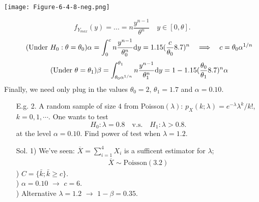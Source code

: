\begin{frame}
	\begin{center}
 \texttt{[image: Figure-6-4-8-neg.png]}
	\end{center}
\[
	f_{Y_{max}}(y) = ... = n\frac{y^{n-1}}{\theta^n} \quad y\in[0,\theta].
\]
\begin{align}\tag{Under $H_0:\theta=\theta_0$}
	\alpha = \int_0^c n\frac{y^{n-1}}{\theta_0^n}\mathrm{d} y = 1.15( \frac{c}{\theta_0} 8.7)^n \quad \Longrightarrow\quad  c= \theta_0\alpha^{1/n}
\end{align}
\begin{align}\tag{Under $\theta=\theta_1$}
\beta = \int_{\theta_0\alpha^{1/n}}^{\theta_1} n\frac{y^{n-1}}{\theta_1^n}\mathrm{d} y
 = 1- 1.15(\frac{\theta_0}{\theta_1}8.7)^n \alpha
\end{align}
Finally, we need only plug in the values $\theta_0=2$, $\theta_1=1.7$ and $\alpha=0.10$.
\myEnd
\end{frame}
\begin{frame}
	\begin{enumerate}
		\item[E.g. 2.] A random sample of size $4$ from Poisson$(\lambda)$: $p_X(k;\lambda)=e^{-\lambda}\lambda^k/k!$, $k=0,1,\cdots$.
			One wants to test
			\[
				H_0:\lambda=0.8 \quad\text{v.s.}\quad
				H_1:\lambda>0.8.
			\]
			at the level $\alpha=0.10$. Find power of test when $\lambda=1.2$.
			\vfill
		\item[Sol.] 1) We've seen: $\overline{X}=\sum_{i=1}^4 X_i$ is a sufficent estimator for $\lambda$;\\
    \begin{align*}
      \overline{X}\sim\text{Poisson}(3.2)
    \end{align*}
			) $C=\{\bar{k};\bar{k}\ge c\}$. \\[1em]) $\alpha=0.10$ $\rightarrow$ $c=6$. \\[1em]) Alternative $\lambda=1.2$ $\rightarrow$ $1-\beta = 0.35$.
	\end{enumerate}
\end{frame}
